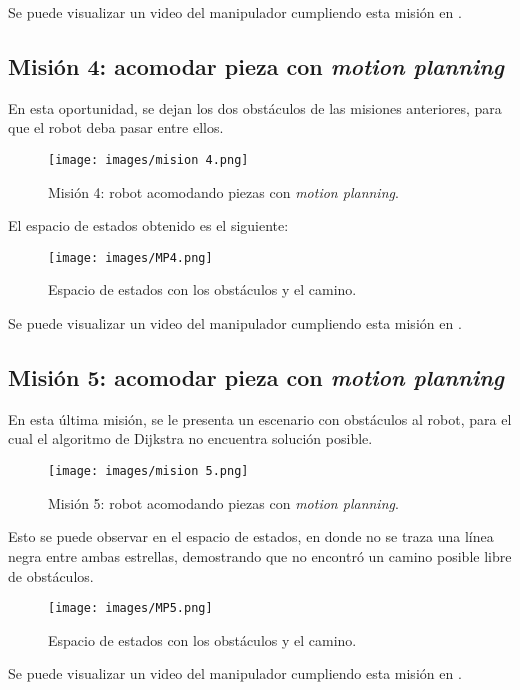 Se puede visualizar un video del manipulador cumpliendo esta misión en \cite{3}.

\subsection{Misión 4: acomodar pieza con \textit{motion planning}}
En esta oportunidad, se dejan los dos obstáculos de las misiones anteriores, para que el robot deba pasar entre ellos.
\begin{figure}[h!]
	\centering
	\texttt{[image: images/mision 4.png]}
	\caption{Misión 4: robot acomodando piezas con \textit{motion planning}.}
	\label{fig:M4}
\end{figure}

El espacio de estados obtenido es el siguiente:
\begin{figure}[h!]
	\centering
	\texttt{[image: images/MP4.png]}
	\caption{Espacio de estados con los obstáculos y el camino.}
	\label{fig:M42}
\end{figure}

Se puede visualizar un video del manipulador cumpliendo esta misión en \cite{4}.

\subsection{Misión 5: acomodar pieza con \textit{motion planning}}
En esta última misión, se le presenta un escenario con obstáculos al robot, para el cual el algoritmo de Dijkstra no encuentra solución posible.
\begin{figure}[h!]
	\centering
	\texttt{[image: images/mision 5.png]}
	\caption{Misión 5: robot acomodando piezas con \textit{motion planning}.}
	\label{fig:M5}
\end{figure}
Esto se puede observar en el espacio de estados, en donde no se traza una línea negra entre ambas estrellas, demostrando que no encontró un camino posible libre de obstáculos.
\begin{figure}[h!]
	\centering
	\texttt{[image: images/MP5.png]}
	\caption{Espacio de estados con los obstáculos y el camino.}
	\label{fig:M52}
\end{figure}

Se puede visualizar un video del manipulador cumpliendo esta misión en \cite{5}.